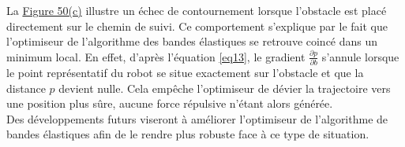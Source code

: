 La \hyperref[fig:image3]{Figure 50(c)} illustre un échec de contournement lorsque l'obstacle est placé directement sur le chemin de suivi. Ce comportement s'explique par le fait que l'optimiseur de l'algorithme des bandes élastiques se retrouve coincé dans un minimum local. En effet, d'après l'équation \eqref{eq13}, le gradient $\frac{\partial p}{\partial b}$ s'annule lorsque le point représentatif du robot se situe exactement sur l'obstacle et que la distance $p$ devient nulle. Cela empêche l'optimiseur de dévier la trajectoire vers une position plus sûre, aucune force répulsive n'étant alors générée.\\

Des développements futurs viseront à améliorer l'optimiseur de l'algorithme de bandes élastiques afin de le rendre plus robuste face à ce type de situation.






